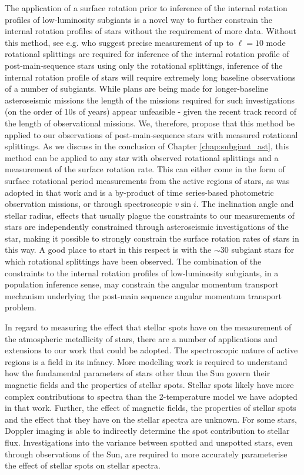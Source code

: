 The application of a surface rotation prior to inference of the internal rotation profiles of low-luminosity subgiants is a novel way to further constrain the internal rotation profiles of stars without the requirement of more data.
Without this method, see e.g. \citet{ahlborn_asteroseismic_2020} who suggest precise measurement of up to $\ell = 10$ mode rotational splittings are required for inference of the internal rotation profile of post-main-sequence stars using only the rotational splittings, inference of the internal rotation profile of stars will require extremely long baseline observations of a number of subgiants.
While plans are being made for longer-baseline asteroseismic missions \citep{rauer_plato_2014, akeson_wide_2019, miglio_haydn_2021} the length of the missions required for such investigations (on the order of 10s of years) appear unfeasible - given the recent track record of the length of observational missions.
We, therefore, propose that this method be applied to our observations of post-main-sequence stars with measured rotational splittings.
As we discuss in the conclusion of Chapter \ref{chap:subgiant_ast}, this method can be applied to any star with observed rotational splittings and a measurement of the surface rotation rate.
This can either come in the form of surface rotational period measurements from the active regions of stars, as was adopted in that work and is a by-product of time series-based photometric observation missions, or through spectroscopic $v \sin{i}$.
The inclination angle and stellar radius, effects that usually plague the constraints to our measurements of stars are independently constrained through asteroseismic investigations of the star, making it possible to strongly constrain the surface rotation rates of stars in this way.
A good place to start in this respect is with the $\sim$30 subgiant stars for which rotational splittings have been observed.
The combination of the constraints to the internal rotation profiles of low-luminosity subgiants, in a population inference sense, may constrain the angular momentum transport mechanism underlying the post-main sequence angular momentum transport problem.

In regard to measuring the effect that stellar spots have on the measurement of the atmospheric metallicity of stars, there are a number of applications and extensions to our work that could be adopted.
The spectroscopic nature of active regions is a field in its infancy.
More modelling work is required to understand how the fundamental parameters of stars other than the Sun govern their magnetic fields and the properties of stellar spots.
Stellar spots likely have more complex contributions to spectra than the 2-temperature model we have adopted in that work.
Further, the effect of magnetic fields, the properties of stellar spots and the effect that they have on the stellar spectra are unknown.
For some stars, Doppler imaging is able to indirectly determine the spot contribution to stellar flux.
Investigations into the variance between spotted and unspotted stars, even through observations of the Sun, are required to more accurately parameterise the effect of stellar spots on stellar spectra.

